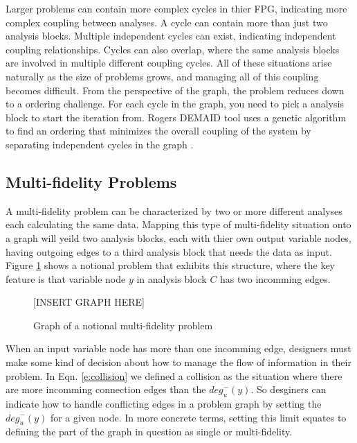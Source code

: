   Larger problems can contain more complex cycles in thier FPG, indicating more 
  complex coupling between analyses. A cycle can contain more than 
  just two analysis blocks. Multiple independent cycles can exist, indicating 
  independent coupling relationships. Cycles can also overlap, where the same analysis 
  blocks are involved in multiple different coupling cycles. All of these situations
  arise naturally as the size of problems grows, and managing all of this coupling 
  becomes difficult. From the perspective of the graph, the problem reduces down to 
  a ordering challenge. For each cycle in the graph, you need to pick a analysis block
  to start the iteration from. Rogers DEMAID tool uses a genetic algorithm to find an ordering 
  that minimizes the overall coupling of the system by separating independent 
  cycles in the graph \cite{rogers1996,rogers1996demaid}. 


\subsection{Multi-fidelity Problems}
  
  A multi-fidelity problem can be characterized by two or more different analyses 
  each calculating the same data. Mapping this type of multi-fidelity situation 
  onto a graph will yeild two analysis blocks, each with thier own output 
  variable nodes, having outgoing edges to a third analysis block that needs the 
  data as input. Figure \ref{f:collision-example} shows a notional problem 
  that exhibits this structure, where the key feature is that variable node $y$ in 
  analysis block $C$ has two incomming edges. 

  \begin{figure}
      \begin{center}
      [INSERT GRAPH HERE]
      \caption{Graph of a notional multi-fidelity problem \label{f:collision-example}}
      \end{center}
  \end{figure}

  When an input variable node has more than one incomming edge, designers must make
  some kind of decision about how to manage the flow of information in their problem. 
  In Eqn. \ref{e:collision} we defined a collision as the situation where
  there are more incomming connection edges than the ${deg}_u^-(y)$. So desginers can
  indicate how to handle conflicting edges in a problem graph by setting the ${deg}_u^-(y)$
  for a given node. In more concrete terms, setting this limit equates to defining 
  the part of the graph in question as single or multi-fidelity. 

